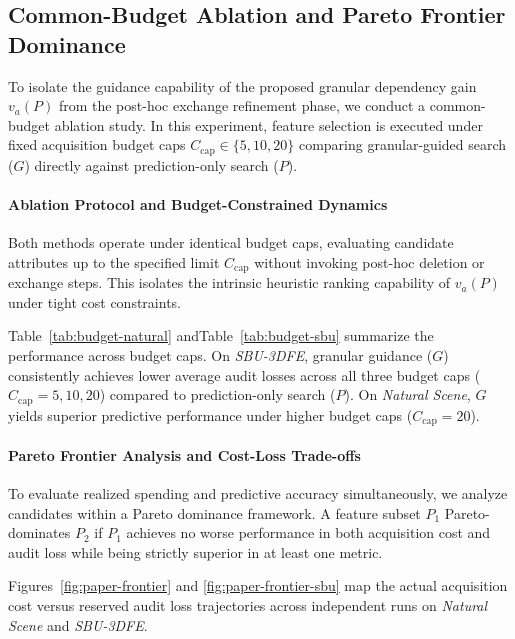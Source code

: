 \FloatBarrier

\subsection{Common-Budget Ablation and Pareto Frontier Dominance}
\label{subsec:budget-ablation}

To isolate the guidance capability of the proposed granular dependency gain $v_a(P)$ from the post-hoc exchange refinement phase, we conduct a common-budget ablation study. In this experiment, feature selection is executed under fixed acquisition budget caps $C_{\mathrm{cap}} \in \{5, 10, 20\}$ comparing granular-guided search ($G$) directly against prediction-only search ($P$).

\paragraph{Ablation Protocol and Budget-Constrained Dynamics}
Both methods operate under identical budget caps, evaluating candidate attributes up to the specified limit $C_{\mathrm{cap}}$ without invoking post-hoc deletion or exchange steps. This isolates the intrinsic heuristic ranking capability of $v_a(P)$ under tight cost constraints.



Table~\ref{tab:budget-natural} andTable~\ref{tab:budget-sbu}  summarize the performance across budget caps. On \textit{SBU-3DFE}, granular guidance ($G$) consistently achieves lower average audit losses across all three budget caps ($C_{\mathrm{cap}} = 5, 10, 20$) compared to prediction-only search ($P$). On \textit{Natural Scene}, $G$ yields superior predictive performance under higher budget caps ($C_{\mathrm{cap}} = 20$).

\paragraph{Pareto Frontier Analysis and Cost-Loss Trade-offs}
To evaluate realized spending and predictive accuracy simultaneously, we analyze candidates within a Pareto dominance framework. A feature subset $P_1$ Pareto-dominates $P_2$ if $P_1$ achieves no worse performance in both acquisition cost and audit loss while being strictly superior in at least one metric.

Figures~\ref{fig:paper-frontier} and \ref{fig:paper-frontier-sbu} map the actual acquisition cost versus reserved audit loss trajectories across independent runs on \textit{Natural Scene} and \textit{SBU-3DFE}.

